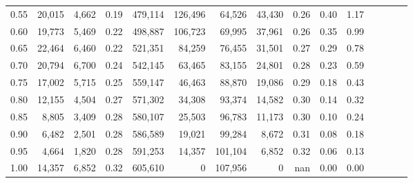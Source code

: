 \begin{tabular}{rrrcrrrrrrrrrrr}
0.55 &  20,015 &  4,662 &                                       0.19 &  479,114 &  126,496 &   64,526 &   43,430 &  0.26 &  0.40 &                         1.17 \\
0.60 &  19,773 &  5,469 &                                       0.22 &  498,887 &  106,723 &   69,995 &   37,961 &  0.26 &  0.35 &                         0.99 \\
0.65 &  22,464 &  6,460 &                                       0.22 &  521,351 &   84,259 &   76,455 &   31,501 &  0.27 &  0.29 &                         0.78 \\
0.70 &  20,794 &  6,700 &                                       0.24 &  542,145 &   63,465 &   83,155 &   24,801 &  0.28 &  0.23 &                         0.59 \\
0.75 &  17,002 &  5,715 &                                       0.25 &  559,147 &   46,463 &   88,870 &   19,086 &  0.29 &  0.18 &                         0.43 \\
0.80 &  12,155 &  4,504 &                                       0.27 &  571,302 &   34,308 &   93,374 &   14,582 &  0.30 &  0.14 &                         0.32 \\
0.85 &   8,805 &  3,409 &                                       0.28 &  580,107 &   25,503 &   96,783 &   11,173 &  0.30 &  0.10 &                         0.24 \\
0.90 &   6,482 &  2,501 &                                       0.28 &  586,589 &   19,021 &   99,284 &    8,672 &  0.31 &  0.08 &                         0.18 \\
0.95 &   4,664 &  1,820 &                                       0.28 &  591,253 &   14,357 &  101,104 &    6,852 &  0.32 &  0.06 &                         0.13 \\
1.00 &  14,357 &  6,852 &                                       0.32 &  605,610 &        0 &  107,956 &        0 &   nan &  0.00 &                         0.00 \\
\bottomrule
\end{tabular}
